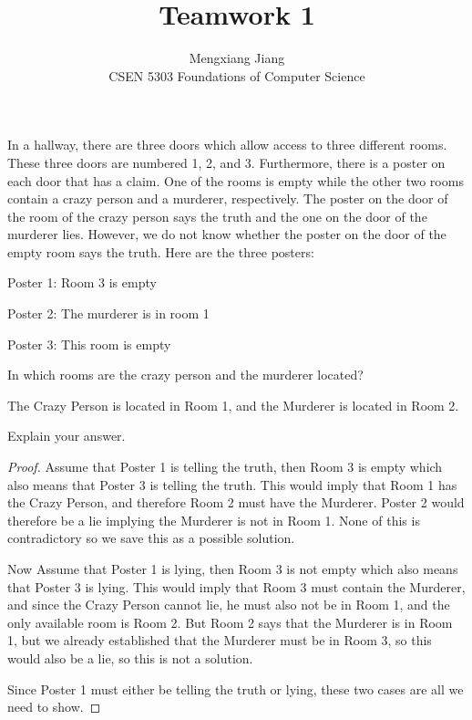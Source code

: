 \documentclass[12pt]{article}
\newenvironment{problem}[2][Problem]{\begin{trivlist}
\item[\hskip \labelsep {\bfseries #1}\hskip \labelsep {\bfseries #2.}]}{\end{trivlist}}
\begin{document}

\title{Teamwork 1}%
\author{Mengxiang Jiang\\ %
CSEN 5303 Foundations of Computer Science} %

\maketitle
\begin{problem}{statement}
In a hallway, there are three doors which allow access to three different
rooms. These three doors are numbered 1, 2, and 3. Furthermore, there is a poster on each door
that has a claim. One of the rooms is empty while the other two rooms contain a crazy person and
a murderer, respectively.
The poster on the door of the room of the crazy person says the truth and the one on the door of
the murderer lies. However, we do not know whether the poster on the door of the empty room
says the truth. Here are the three posters: 

Poster 1: Room 3 is empty

Poster 2: The murderer is in room 1

Poster 3: This room is empty

\end{problem}


\begin{problem}{1} %
In which rooms are the crazy person and the murderer located?

The Crazy Person is located in Room 1, and the Murderer is located in Room 2.
\end{problem}

\begin{problem}{2}
Explain your answer.
\end{problem}

\begin{proof}
Assume that Poster 1 is telling the truth, then Room 3 is empty which also means that Poster 3 is telling the truth. This would imply that Room 1 has the Crazy Person, and therefore Room 2 must have the Murderer. Poster 2 would therefore be a lie implying the Murderer is not in Room 1. None of this is contradictory so we save this as a possible solution.

Now Assume that Poster 1 is lying, then Room 3 is not empty which also means that Poster 3 is lying. This would imply that Room 3 must contain the Murderer, and since the Crazy Person cannot lie, he must also not be in Room 1, and the only available room is Room 2. But Room 2 says that the Murderer is in Room 1, but we already established that the Murderer must be in Room 3, so this would also be a lie, so this is not a solution.

Since Poster 1 must either be telling the truth or lying, these two cases are all we need to show.
\end{proof}
\end{document}
